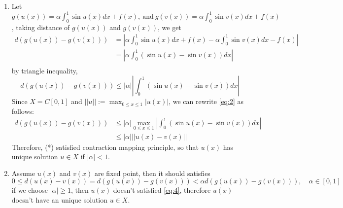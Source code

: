 \documentclass[a4paper,12pt]{article}
\theoremstyle{definition}
\begin{document}
	\begin{enumerate}
		\item 	Let $g(u(x)) = \alpha \int_{0}^{1} \sin u(x) dx + f(x),\ \text{and}\ g(v(x)) = \alpha \int_{0}^{1} \sin v(x) dx + f(x)$, taking distance of $g(u(x))$ and $g(v(x))$, we get
		\begin{equation}\label{eq:1}
		\begin{aligned}
		d(g(u(x)) - g(v(x))) &= \left| \alpha \int_{0}^{1} \sin u(x) dx + f(x) - \alpha \int_{0}^{1} \sin v(x) dx - f(x) \right|\\
		&= \left| \alpha \int_{0}^{1} (\sin u(x) - \sin v(x)) dx \right|\\
		\end{aligned}
		\end{equation}
		by triangle inequality,
		\begin{equation}\label{eq:2}
		d(g(u(x)) - g(v(x))) \leq \left| \alpha \right| \left| \int_{0}^{1} (\sin u(x) - \sin v(x)) dx \right|
		\end{equation}
		Since $X=C[0,1]$ and $\left|| u \right|| := \max_{0\leq x \leq 1} \left| u(x) \right|$, we can rewrite \eqref{eq:2} as follows:
		\begin{equation}\label{eq:3}
		\begin{aligned}
		d(g(u(x)) - g(v(x))) &\leq \left| \alpha \right| \max_{0\leq x \leq 1}\left| \int_{0}^{1} (\sin u(x) - \sin v(x)) dx \right|\\
		&\leq \left| \alpha \right| \left|| u(x) - v(x) \right||
		\end{aligned}
		\end{equation}
		Therefore, (*) satisfied contraction mapping principle, so that $u(x)$ has unique solution $u \in X$ if $\left| \alpha \right| < 1$.
		
		\item Assume $u(x)$ and $v(x)$ are fixed point, then it should satisfies
		\begin{equation}\label{eq:4}
		0 \leq d(u(x) - v(x)) = d(g(u(x)) - g(v(x))) < \alpha d(g(u(x)) - g(v(x))), \quad \alpha \in [0,1]
		\end{equation}
		if we choose $\left| \alpha \right| \geq 1$, then $u(x)$ doesn't satisfied \eqref{eq:4}, therefore $u(x)$ doesn't have an unique solution $u\in X$.
	\end{enumerate}
\end{document}
